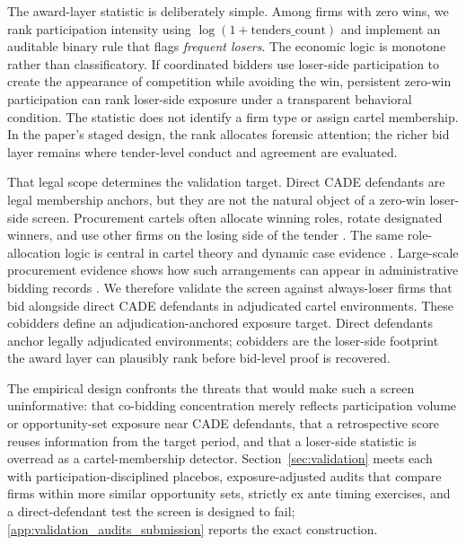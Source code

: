 The award-layer statistic is deliberately simple. Among firms
with zero wins, we rank participation intensity using
$\log(1+\text{tenders\_count})$ and implement an auditable
binary rule that flags \emph{frequent losers}. The economic
logic is monotone rather than classificatory. If coordinated
bidders use loser-side participation to create the appearance of
competition while avoiding the win, persistent zero-win
participation can rank loser-side exposure under a transparent
behavioral condition. The statistic does not identify a firm
type or assign cartel membership. In the paper's staged design,
the rank allocates forensic attention; the richer bid layer
remains where tender-level conduct and agreement are evaluated.

That legal scope determines the validation target. Direct CADE
defendants are legal membership anchors, but they are not the
natural object of a zero-win loser-side screen. Procurement
cartels often allocate winning roles, rotate designated
winners, and use other firms on the losing side of the tender
\citep{pesendorfer2000study,asker2010leniency}. The same
role-allocation logic is central in cartel theory and dynamic
case evidence \citep{marshall2012economics,clark2021collusion}.
Large-scale
procurement evidence shows how such arrangements can appear in
administrative bidding records \citep{kawai2022detecting}.
We therefore
validate the screen against always-loser firms that bid
alongside direct CADE defendants in adjudicated cartel
environments. These cobidders define an adjudication-anchored
exposure target. Direct defendants anchor legally adjudicated
environments; cobidders are the loser-side footprint the award
layer can plausibly rank before bid-level proof is recovered.

The empirical design confronts the threats that would make such a
screen uninformative: that co-bidding concentration merely
reflects participation volume or opportunity-set exposure near
CADE defendants, that a retrospective score reuses information
from the target period, and that a loser-side statistic is
overread as a cartel-membership detector. Section~\ref{sec:validation}
meets each with participation-disciplined placebos,
exposure-adjusted audits that compare firms within more similar
opportunity sets, strictly ex ante timing exercises, and a
direct-defendant test the screen is designed to fail;
\ref{app:validation_audits_submission} reports the exact
construction.

